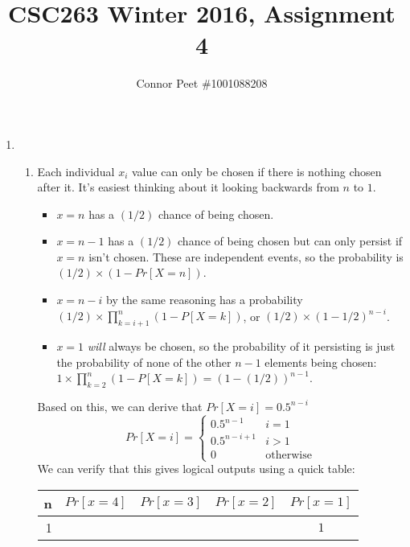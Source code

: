 \documentclass{article}
\title{CSC263 Winter 2016, Assignment 4}
\author{Connor Peet \#1001088208}
\begin{document}
\maketitle

\lstset{
    numbers=left
}

\begin{enumerate}
\item
    \begin{enumerate}
    \item Each individual $x_i$ value can only be chosen if there is nothing chosen after it. It's easiest thinking about it looking backwards from $n$ to $1$.
        \begin{itemize}
            \item $x = n$ has a $(1 / 2)$ chance of being chosen.
            \item $x = n - 1$ has a $(1 / 2)$ chance of being chosen but can only persist if $x = n$ isn't chosen. These are independent events, so the probability is $(1/2) \times (1 - Pr[X = n])$.
            \item $x = n - i$ by the same reasoning has a probability $(1 / 2) \times \prod_{k = i + 1}^n (1 - P[X = k])$, or $(1 / 2) \times (1 - 1/2)^{n - i}$.
            \item $x = 1$ \textit{will} always be chosen, so the probability of it persisting is just the probability of none of the other $n - 1$ elements being chosen: $1 \times \prod_{k = 2}^n (1 - P[X = k]) = (1 - (1 / 2))^{n - 1}$.
        \end{itemize}
        Based on this, we can derive that $Pr[X = i] = 0.5^{n - i}$
        \begin{equation*}
            Pr[X = i] = \begin{cases}
                0.5^{n - 1} & i = 1 \\
                0.5^{n - i + 1} & i > 1 \\
                0 & \text{otherwise}
            \end{cases}
        \end{equation*}
        We can verify that this gives logical outputs using a quick table:
        \begin{center}
        \begin{tabular}{ r || c | c | c | c }
            n & $Pr[x = 4]$ & $Pr[x = 3]$ & $Pr[x = 2]$ & $Pr[x = 1]$ \\
            \hline
            \hline
            1 &       &       &       & $1$   \\ \hline

\end{tabular}
\end{center}
\end{enumerate}
\end{enumerate}
\end{document}
